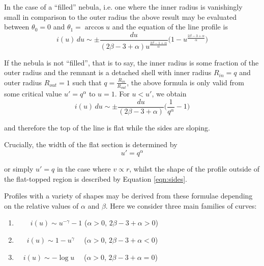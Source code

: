 In the case of a ``filled'' nebula, i.e. one where the inner radius is vanishingly small in comparison to the outer radius the above result may be evaluated between $\theta_0=0$ and $\theta_1=\arccos u$ and the equation of the line profile is
\begin{equation}
\label{eqn:sides}
	i(u) \, du \sim \pm \frac{du}{(2\beta-3+\alpha) u^{\frac{2\beta-1+\alpha}{\alpha}}} \Big(1-u^{\frac{2\beta-3+\alpha}{\alpha}} \Big)
\end{equation}

If the nebula is not ``filled'', that is to say, the inner radius is some fraction of the outer radius and the remnant is a detached shell  with inner radius $R_{in}=q$ and outer radius $R_{out}=1$ such that $q=\frac{R_{in}}{R_{out}}$, the 
above formula is only valid from some critical value $u'=q^{\alpha}$ to $u=1$. For $u<u'$, we obtain
\begin{equation}
i(u) \, du \sim \pm \frac{du}{(2\beta-3+\alpha)} \Big( \frac{1}{q^\alpha} - 1 \Big)
\end{equation}

\noindent and therefore the top of the line is flat while the sides are 
sloping.

Crucially, the width of the flat section is determined by 
\begin{equation}
\label{eqn:flattop}
u'=q^{\alpha}
\end{equation} 

\noindent or simply $u'=q$ in the case where $v \propto r$, whilst the shape of the profile outside of the flat-topped region is described by Equation  \ref{eqn:sides}.

Profiles with a variety of shapes may be derived from these formulae  depending on the relative values of $\alpha$ and $\beta$.  Here we consider three main families of curves:


\begin{enumerate}\parskip3pt

	\item \ \ $\quad i(u)  \sim u^{-\gamma}-1$ \quad ($\alpha>0$, $2\beta-3+\alpha>0$)
	\item \ $\quad i(u)  \sim 1-u^\gamma$ \quad \ \ ($\alpha>0$, $2\beta-3+\alpha<0$)
	\item  $\quad i(u) \sim -\log u$ \quad \ \ ($\alpha>0$, $2\beta-3+\alpha=0$)

\end{enumerate}

